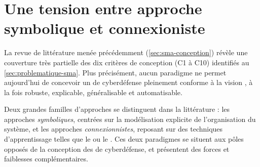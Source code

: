 \section{Une tension entre approche symbolique et connexioniste}\label{sec:limits-existing}

La revue de littérature menée précédemment (\autoref{sec:sma-conception}) révèle une couverture très partielle des dix critères de conception (C1 à C10) identifiés au \autoref{sec:problematique-sma}. Plus précisément, aucun paradigme ne permet aujourd'hui de concevoir un  de cyberdéfense pleinement conforme à la vision , à la fois robuste, explicable, généralisable et automatisable.

Deux grandes familles d'approches se distinguent dans la littérature : les approches \textit{symboliques}, centrées sur la modélisation explicite de l'organisation du système, et les approches \textit{connexionnistes}, reposant sur des techniques d'apprentissage telles que le  ou le . Ces deux paradigmes se situent aux pôles opposés de la conception des  de cyberdéfense, et présentent des forces et faiblesses complémentaires.

